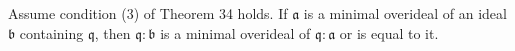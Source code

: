 Assume condition (3) of Theorem 34 holds. If $\mathfrak{a}$ is a minimal overideal of an ideal $\mathfrak{b}$ containing $\mathfrak{q}$, then $\mathfrak{q} : \mathfrak{b}$ is a minimal overideal of $\mathfrak{q} : \mathfrak{a}$ or is equal to it.
